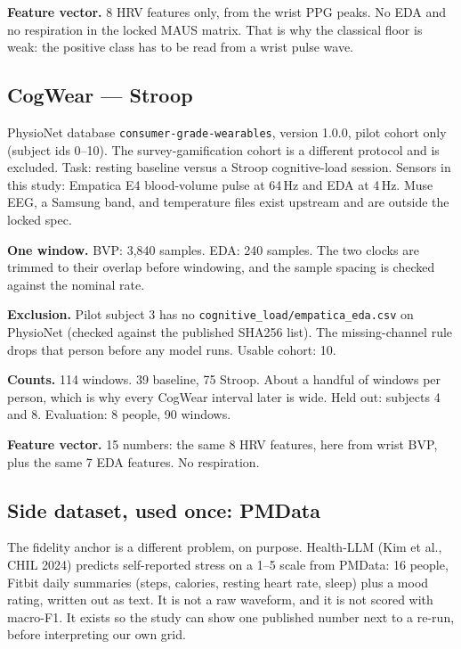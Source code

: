 \documentclass[11pt]{article}
\begin{document}
\textbf{Feature vector.} 8 HRV features only, from the wrist PPG peaks. No EDA and no respiration in the locked MAUS matrix. That is why the classical floor is weak: the positive class has to be read from a wrist pulse wave.

\subsection{CogWear --- Stroop}

PhysioNet database \texttt{consumer-grade-wearables}, version 1.0.0, pilot cohort only (subject ids 0--10). The survey-gamification cohort is a different protocol and is excluded. Task: resting baseline versus a Stroop cognitive-load session. Sensors in this study: Empatica E4 blood-volume pulse at 64\,Hz and EDA at 4\,Hz. Muse EEG, a Samsung band, and temperature files exist upstream and are outside the locked spec.

\textbf{One window.} BVP: 3{,}840 samples. EDA: 240 samples. The two clocks are trimmed to their overlap before windowing, and the sample spacing is checked against the nominal rate.

\textbf{Exclusion.} Pilot subject 3 has no \texttt{cognitive\_load/empatica\_eda.csv} on PhysioNet (checked against the published SHA256 list). The missing-channel rule drops that person before any model runs. Usable cohort: 10.

\textbf{Counts.} 114 windows. 39 baseline, 75 Stroop. About a handful of windows per person, which is why every CogWear interval later is wide. Held out: subjects 4 and 8. Evaluation: 8 people, 90 windows.

\textbf{Feature vector.} 15 numbers: the same 8 HRV features, here from wrist BVP, plus the same 7 EDA features. No respiration.

\subsection{Side dataset, used once: PMData}

The fidelity anchor is a different problem, on purpose. Health-LLM (Kim et al., CHIL 2024) predicts self-reported stress on a 1--5 scale from PMData: 16 people, Fitbit daily summaries (steps, calories, resting heart rate, sleep) plus a mood rating, written out as text. It is not a raw waveform, and it is not scored with macro-F1. It exists so the study can show one published number next to a re-run, before interpreting our own grid.

\end{document}
